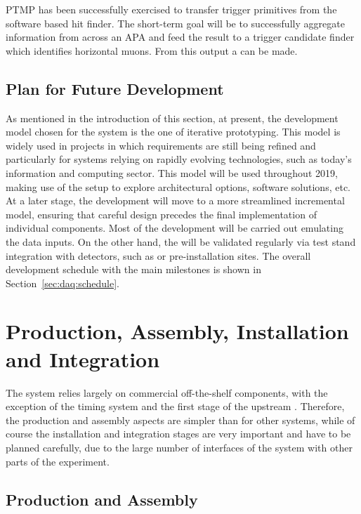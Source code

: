 PTMP has been successfully exercised to transfer trigger primitives from the software based hit finder. The short-term goal will be to successfully aggregate information from across an APA and feed the result to a trigger candidate finder which identifies horizontal muons. From this output a  can be made.


\subsection{Plan for Future Development}
\label{sec:daq:design-plans}

As mentioned in the introduction of this section, at present, the development model chosen for the  system is the one of iterative prototyping.
This model is widely used in projects in which requirements are still
being refined and particularly for systems relying on rapidly evolving technologies, such as today's information and computing sector. 
This model will be used throughout 2019, making use of the  setup to explore architectural options, software solutions, etc.
At a later stage, the  development will move to a more streamlined incremental model, ensuring that careful design precedes the final implementation of individual components.
Most of the development will be carried out emulating the data inputs.
On the other hand, the  will be validated regularly via test stand integration with detectors, such as  or pre-installation sites.
The overall development schedule with the main  milestones is shown in Section~\ref{sec:daq:schedule}.



\section{Production, Assembly, Installation and Integration}
\label{sec:daq:production}

The  system relies largely on commercial off-the-shelf components, with the exception of the timing system and the first stage of the upstream .
Therefore, the production and assembly aspects are simpler than for other systems, while of course the installation and integration stages are very important and have to be planned carefully, due to the large number of interfaces of the  system with other parts of the experiment.

\subsection{Production and Assembly}
